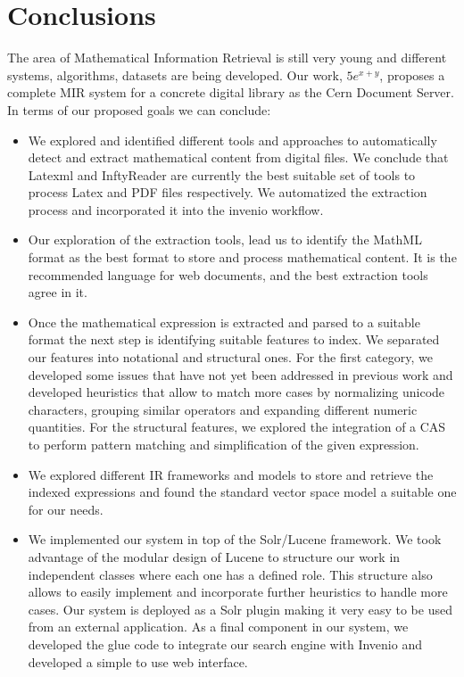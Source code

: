 \chapter{Conclusions}
\label{chap-conclusions}

The area of Mathematical Information Retrieval is still very young and different systems, algorithms, datasets are being developed. Our work, $5e^{x+y}$, proposes a complete MIR system for a concrete digital library as the Cern Document Server. In terms of our proposed goals we can conclude:

\begin{itemize}
\item We explored and identified different tools and approaches to automatically detect and extract mathematical content from digital files. We conclude that Latexml and InftyReader are currently the best suitable set of tools to process Latex and PDF files respectively. We automatized the extraction process and incorporated it into the invenio workflow.
\item Our exploration of the extraction tools, lead us to identify the MathML format as the best format to store and process mathematical content. It is the recommended language for web documents, and the best extraction tools agree in it.
\item Once the mathematical expression is extracted and parsed to a suitable format the next step is identifying suitable features to index. We separated our features into notational and structural ones. For the first category, we developed some issues that have not yet been addressed in previous work and developed heuristics that allow to match more cases by normalizing unicode characters, grouping similar operators and expanding different numeric quantities. For the structural features, we explored the integration of a CAS to perform pattern matching and simplification of the given expression. 
\item We explored different IR frameworks and models to store and retrieve the indexed expressions and found the standard vector space model a suitable one for our needs.  
\item We implemented our system in top of the Solr/Lucene framework. We took advantage of the modular design of Lucene to structure our work in independent classes where each one has a defined role. This structure also allows to easily implement and incorporate further heuristics to handle more cases. Our system is deployed as a Solr plugin making it very easy to be used from an external application. As a final component in our system, we developed the glue code to integrate our search engine with Invenio and developed a simple to use web interface.

\end{itemize}
